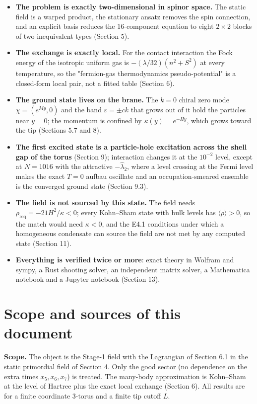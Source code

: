 \documentclass[11pt]{article}
\begin{document}
\begin{itemize}
\item \textbf{The problem is exactly two-dimensional in spinor space.} The static field is a warped product, the stationary ansatz removes the spin connection, and an explicit basis reduces the 16-component equation to eight $2\times2$ blocks of two inequivalent types (Section 5).
\item \textbf{The exchange is exactly local.} For the contact interaction the Fock energy of the isotropic uniform gas is $-(\lambda/32)(n^2+S^2)$ at every temperature, so the "fermion-gas thermodynamics pseudo-potential" is a closed-form local pair, not a fitted table (Section 6).
\item \textbf{The ground state lives on the brane.} The $k=0$ chiral zero mode $\chi=(e^{My},0)$ and the band $\varepsilon=\pm ck$ that grows out of it hold the particles near $y=0$; the momentum is confined by $\kappa(y)=e^{-Hy}$, which grows toward the tip (Sections 5.7 and 8).
\item \textbf{The first excited state is a particle-hole excitation across the shell gap of the torus} (Section 9); interaction changes it at the $10^{-2}$ level, except at $N=1016$ with the attractive $-\hat\lambda_2$, where a level crossing at the Fermi level makes the exact $T=0$ aufbau oscillate and an occupation-smeared ensemble is the converged ground state (Section 9.3).
\item \textbf{The field is not sourced by this state.} The field needs $\rho_{\mathrm{req}}=-21H^2/\kappa<0$; every Kohn--Sham state with bulk levels has $\langle\rho\rangle>0$, so the match would need $\kappa<0$, and the E4.1 conditions under which a homogeneous condensate can source the field are not met by any computed state (Section 11).
\item \textbf{Everything is verified twice or more}: exact theory in Wolfram and sympy, a Rust shooting solver, an independent matrix solver, a Mathematica notebook and a Jupyter notebook (Section 13).
\end{itemize}

\section{Scope and sources of this document}

\textbf{Scope.} The object is the Stage-1 field with the Lagrangian of Section 6.1 in the static primordial field of Section 4. Only the good sector (no dependence on the extra times $x_5,x_6,x_7$) is treated. The many-body approximation is Kohn--Sham at the level of Hartree plus the exact local exchange (Section 6). All results are for a finite coordinate 3-torus and a finite tip cutoff $L$.
\end{document}
